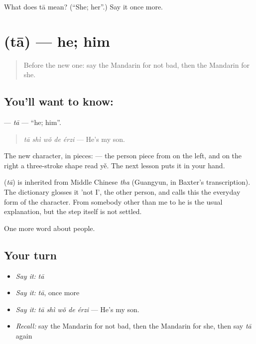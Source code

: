 \begin{tcolorbox}[breakable,colback=teal!4,colframe=teal!35!black,title={Before you move on}]
What does tā mean? (\textquotedblleft{}She; her\textquotedblright{}.) Say it once more.
\end{tcolorbox}
\section[\texorpdfstring{\zh{他} (tā)}{他 (tā)}]{ (tā) — he; him}

\label{lesson:ZH-C31-ta-he}



\begin{quote}
Before the new one: say the Mandarin for not bad, then the Mandarin for she.
\end{quote}

\subsection*{You'll want to know: }
\textbf{} — \emph{tā} — \textquotedblleft{}he; him\textquotedblright{}.

\begin{quote}
\textbf{} \emph{tā shì wǒ de érzi} — He's my son.
\end{quote}

The new character, in pieces:  — the person piece from  on the left, and on the right a three-stroke shape read yě. The next lesson puts it in your hand.

\begin{cousinweb}
\textbf{} (\emph{tā}) is inherited from Middle Chinese \emph{tha} (Guangyun, in Baxter's transcription). The dictionary glosses it 'not I', the other person, and calls this the everyday form of the character. From somebody other than me to he is the usual explanation, but the step itself is not settled.
\end{cousinweb}

\begin{grammarlens}[title={What you've built}]
One more word about people.
\end{grammarlens}

\subsection*{Your turn}
\begin{itemize}
\raggedright
  \item \emph{Say it:} \emph{tā}
  \item \emph{Say it:} \emph{tā}, once more
  \item \emph{Say it:} \emph{tā shì wǒ de érzi} — He's my son.
  \item \emph{Recall:} say the Mandarin for not bad, then the Mandarin for she, then say \emph{tā} again
\end{itemize}

